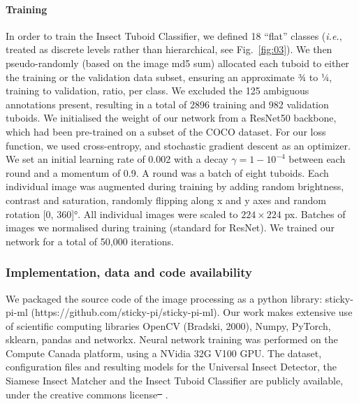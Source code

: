 \documentclass[12pt]{article}
\providecommand{\DIFaddtex}[1]{{\protect\color{blue}\uwave{#1}}} %
\providecommand{\DIFdeltex}[1]{{\protect\color{red}\sout{#1}}}                      %
\providecommand{\DIFaddbegin}{} %
\providecommand{\DIFaddend}{} %
\providecommand{\DIFdelbegin}{} %
\providecommand{\DIFdelend}{} %
\providecommand{\DIFadd}[1]{\texorpdfstring{\DIFaddtex{#1}}{#1}} %
\providecommand{\DIFdel}[1]{\texorpdfstring{\DIFdeltex{#1}}{}} %
\newcommand{\DIFscaledelfig}{0.5}
\newlength{\DIFdelgraphicswidth} %
\newlength{\DIFdelgraphicsheight} %
\newcommand{\DIFaddincludegraphics}[2][]{{\color{blue}\fbox{\DIFOincludegraphics[#1]{#2}}}} %
\newcommand{\DIFdelincludegraphics}[2][]{%
\sbox{\DIFdelgraphicsbox}{\DIFOincludegraphics[#1]{#2}}%
\settoboxwidth{\DIFdelgraphicswidth}{\DIFdelgraphicsbox} %
\settoboxtotalheight{\DIFdelgraphicsheight}{\DIFdelgraphicsbox} %
\scalebox{\DIFscaledelfig}{%
\parbox[b]{\DIFdelgraphicswidth}{\usebox{\DIFdelgraphicsbox}\\[-\baselineskip] \rule{\DIFdelgraphicswidth}{0em}}\llap{\resizebox{\DIFdelgraphicswidth}{\DIFdelgraphicsheight}{%
\setlength{\unitlength}{\DIFdelgraphicswidth}%
\begin{picture}(1,1)%
\thicklines\linethickness{2pt} %
{\color[rgb]{1,0,0}\put(0,0){\framebox(1,1){}}}%
{\color[rgb]{1,0,0}\put(0,0){\line( 1,1){1}}}%
{\color[rgb]{1,0,0}\put(0,1){\line(1,-1){1}}}%
\end{picture}%
}\hspace*{3pt}}} %
} %
\DeclareRobustCommand{\DIFaddbegin}{\DIFOaddbegin \let\includegraphics\DIFaddincludegraphics} %
\DeclareRobustCommand{\DIFaddend}{\DIFOaddend \let\includegraphics\DIFOincludegraphics} %
\DeclareRobustCommand{\DIFdelbegin}{\DIFOdelbegin \let\includegraphics\DIFdelincludegraphics} %
\DeclareRobustCommand{\DIFdelend}{\DIFOaddend \let\includegraphics\DIFOincludegraphics} %
\begin{document}
\begin{linenumbers}
		\paragraph{Training}
		In order to train the Insect Tuboid Classifier, we defined 18 “flat” classes (\emph{i.e.}, treated as discrete levels rather than hierarchical, see Fig.~\ref{fig:03}). We then pseudo-randomly (based on the image md5 sum) allocated each tuboid to either the training or the validation data subset, ensuring an approximate ¾ to ¼, training to validation, ratio, per class. We excluded the 125 ambiguous annotations present, resulting in a total of 2896 training and 982 validation tuboids. 
		We initialised the weight of our network from a ResNet50 backbone, which had been pre-trained on a subset of the COCO dataset. For our loss function, we used cross-entropy, and stochastic gradient descent as an optimizer. We set an initial learning rate of 0.002 with a decay $\gamma = 1- 10^{-4}$ between each round and a momentum of 0.9. A round was a batch of eight tuboids. Each individual image was augmented during training by adding random brightness, contrast and saturation, randomly flipping along x and y axes and random rotation [0, 360]°. All individual images were scaled to $224 \times{} 224$ px. Batches of images we normalised during training (standard for ResNet). We trained our network for a total of 50,000 iterations.

		\subsubsection*{Implementation, data and code availability}
		We packaged the source code of the image processing as a python library: sticky-pi-ml (https://github.com/sticky-pi/sticky-pi-ml). Our work makes extensive use of scientific computing libraries OpenCV (Bradski, 2000), Numpy\cite{harris_array_2020}, PyTorch\cite{paszke_pytorch_2019}, sklearn\cite{pedregosa_scikit-learn_2011}, pandas\cite{the_pandas_development_team_pandas-devpandas_2020} and networkx\cite{hagberg_exploring_2008}. Neural network training was performed on the Compute Canada platform, using a NVidia 32G V100 GPU. The dataset, configuration files and resulting models for the Universal Insect Detector, the Siamese Insect Matcher and the Insect Tuboid Classifier are publicly available, under the creative commons license\DIFdelbegin \DIFdel{\mbox{%
\cite{geissmann_sticky_2021}}\hskip0pt%
}\DIFdelend \DIFaddbegin \DIFadd{\mbox{%
\cite{geissmann_sticky_2022}}\hskip0pt%
}\DIFaddend . 


\end{linenumbers}
\end{document}

